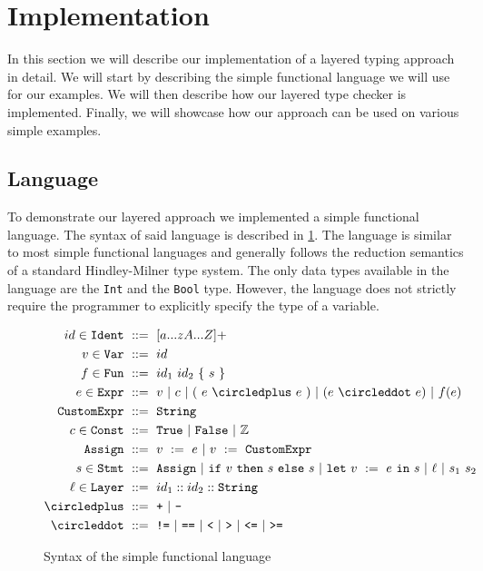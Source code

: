 \documentclass[acmsmall, review, screen]{acmart}
\begin{document}
\section{Implementation}
\label{sec:implementation}

In this section we will describe our implementation of a layered typing approach in detail. We will start by describing the simple functional language we will use for our examples. We will then describe how our layered type checker is implemented. Finally, we will showcase how our approach can be used on various simple examples.

\subsection{Language}
\label{ssec:language}

To demonstrate our layered approach we implemented a simple functional language. The syntax of said language is described in \ref{fig:lang}. The language is similar to most simple functional languages and generally follows the reduction semantics of a standard Hindley-Milner type system. The only data types available in the language are the \texttt{Int} and the \texttt{Bool} type. However, the language does not strictly require the programmer to explicitly specify the type of a variable.

\begin{figure}[ht!]
\begin{align*}
	id \in \texttt{Ident}\ 	&::=\ [a...zA...Z]+ \\
	v \in \texttt{Var}\ 	&::=\ id \\
	f \in \texttt{Fun}\ 	&::=\ id_1\ id_2\ \{\ s\ \}\\
	e \in \texttt{Expr}\ 	&::=\ v\ |\ c\ |\ (\ e\ \circledplus\ e\ )\ |\ (e\ \circleddot\ e)\ |\ f(e) \\
	\texttt{CustomExpr}\ 	&::=\ \texttt{String}\\
	c \in \texttt{Const}\ 	&::=\ \texttt{True}\ |\ \texttt{False}\ |\ \mathbb{Z} \\
	\texttt{Assign}\ 	&::=\ v\ :=\ e\ |\ v\ :=\ \texttt{CustomExpr}\ \\
	s \in \texttt{Stmt}\ 	&::=\ \texttt{Assign}\ |\ \texttt{if}\ v\ \texttt{then}\ s\ \texttt{else}\ s\ |\ \texttt{let}\ v\ :=\ e\ \texttt{in}\ s\ |\ \ell\ |\ s_1\ s_2\ \\
	\ell \in \texttt{Layer}\ 	&::=\ id_1::id_2::\texttt{String} \\
	\circledplus\ 		&::=\ \texttt{+}\ |\ \texttt{-} \\
	\circleddot\ 		&::=\ \texttt{!=}\ |\ \texttt{==}\ |\ \texttt{<} \ |\ \texttt{>} \ |\ \texttt{<=} \ |\ \texttt{>=} \\
\end{align*}
\caption{Syntax of the simple functional language}
\label{fig:lang}
\end{figure}
\end{document}
